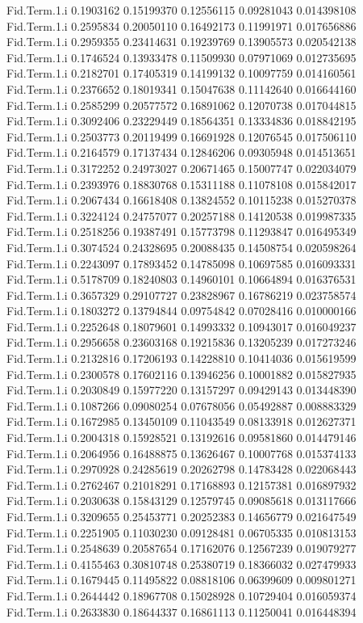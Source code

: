\documentclass[11pt]{article} %
\begin{document}
\begin{Schunk}
\begin{Soutput}
Fid.Term.1.i 0.1903162 0.15199370 0.12556115 0.09281043 0.014398108
Fid.Term.1.i 0.2595834 0.20050110 0.16492173 0.11991971 0.017656886
Fid.Term.1.i 0.2959355 0.23414631 0.19239769 0.13905573 0.020542138
Fid.Term.1.i 0.1746524 0.13933478 0.11509930 0.07971069 0.012735695
Fid.Term.1.i 0.2182701 0.17405319 0.14199132 0.10097759 0.014160561
Fid.Term.1.i 0.2376652 0.18019341 0.15047638 0.11142640 0.016644160
Fid.Term.1.i 0.2585299 0.20577572 0.16891062 0.12070738 0.017044815
Fid.Term.1.i 0.3092406 0.23229449 0.18564351 0.13334836 0.018842195
Fid.Term.1.i 0.2503773 0.20119499 0.16691928 0.12076545 0.017506110
Fid.Term.1.i 0.2164579 0.17137434 0.12846206 0.09305948 0.014513651
Fid.Term.1.i 0.3172252 0.24973027 0.20671465 0.15007747 0.022034079
Fid.Term.1.i 0.2393976 0.18830768 0.15311188 0.11078108 0.015842017
Fid.Term.1.i 0.2067434 0.16618408 0.13824552 0.10115238 0.015270378
Fid.Term.1.i 0.3224124 0.24757077 0.20257188 0.14120538 0.019987335
Fid.Term.1.i 0.2518256 0.19387491 0.15773798 0.11293847 0.016495349
Fid.Term.1.i 0.3074524 0.24328695 0.20088435 0.14508754 0.020598264
Fid.Term.1.i 0.2243097 0.17893452 0.14785098 0.10697585 0.016093331
Fid.Term.1.i 0.5178709 0.18240803 0.14960101 0.10664894 0.016376531
Fid.Term.1.i 0.3657329 0.29107727 0.23828967 0.16786219 0.023758574
Fid.Term.1.i 0.1803272 0.13794844 0.09754842 0.07028416 0.010000166
Fid.Term.1.i 0.2252648 0.18079601 0.14993332 0.10943017 0.016049237
Fid.Term.1.i 0.2956658 0.23603168 0.19215836 0.13205239 0.017273246
Fid.Term.1.i 0.2132816 0.17206193 0.14228810 0.10414036 0.015619599
Fid.Term.1.i 0.2300578 0.17602116 0.13946256 0.10001882 0.015827935
Fid.Term.1.i 0.2030849 0.15977220 0.13157297 0.09429143 0.013448390
Fid.Term.1.i 0.1087266 0.09080254 0.07678056 0.05492887 0.008883329
Fid.Term.1.i 0.1672985 0.13450109 0.11043549 0.08133918 0.012627371
Fid.Term.1.i 0.2004318 0.15928521 0.13192616 0.09581860 0.014479146
Fid.Term.1.i 0.2064956 0.16488875 0.13626467 0.10007768 0.015374133
Fid.Term.1.i 0.2970928 0.24285619 0.20262798 0.14783428 0.022068443
Fid.Term.1.i 0.2762467 0.21018291 0.17168893 0.12157381 0.016897932
Fid.Term.1.i 0.2030638 0.15843129 0.12579745 0.09085618 0.013117666
Fid.Term.1.i 0.3209655 0.25453771 0.20252383 0.14656779 0.021647549
Fid.Term.1.i 0.2251905 0.11030230 0.09128481 0.06705335 0.010813153
Fid.Term.1.i 0.2548639 0.20587654 0.17162076 0.12567239 0.019079277
Fid.Term.1.i 0.4155463 0.30810748 0.25380719 0.18366032 0.027479933
Fid.Term.1.i 0.1679445 0.11495822 0.08818106 0.06399609 0.009801271
Fid.Term.1.i 0.2644442 0.18967708 0.15028928 0.10729404 0.016059374
Fid.Term.1.i 0.2633830 0.18644337 0.16861113 0.11250041 0.016448394

\end{Soutput}
\end{Schunk}
\end{document}
